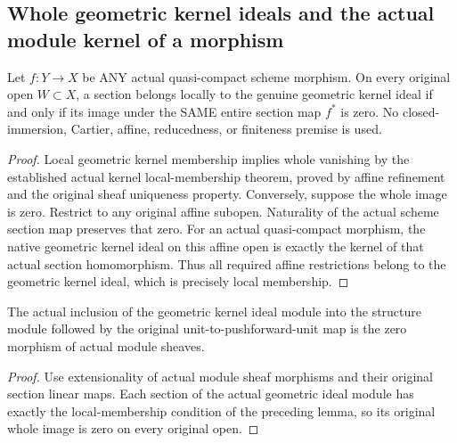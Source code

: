 \subsection{Whole geometric kernel ideals and the actual module kernel of a morphism}

\begin{lemma}
\label{alggeom:actual-morphism-kernel-whole-local-membership}
\leanok
Let $f:Y\to X$ be ANY actual quasi-compact scheme morphism. On every original
open $W\subset X$, a section belongs locally to the genuine geometric kernel
ideal if and only if its image under the SAME entire section map $f^*$ is zero.
No closed-immersion, Cartier, affine, reducedness, or finiteness premise is used.
\end{lemma}
\begin{proof}
Local geometric kernel membership implies whole vanishing by the established
actual kernel local-membership theorem, proved by affine refinement and the
original sheaf uniqueness property. Conversely, suppose the whole image is
zero. Restrict to any original affine subopen. Naturality of the actual scheme
section map preserves that zero. For an actual quasi-compact morphism, the
native geometric kernel ideal on this affine open is exactly the kernel of
that actual section homomorphism. Thus all required affine restrictions belong
to the geometric kernel ideal, which is precisely local membership.
\end{proof}

\begin{lemma}
\label{alggeom:actual-morphism-kernel-inclusion-zero}
\leanok
{}
The actual inclusion of the geometric kernel ideal module into the structure
module followed by the original unit-to-pushforward-unit map is the zero
morphism of actual module sheaves.
\end{lemma}
\begin{proof}
Use extensionality of actual module sheaf morphisms and their original section
linear maps. Each section of the actual geometric ideal module has exactly
the local-membership condition of the preceding lemma, so its original whole
image is zero on every original open.
\end{proof}

